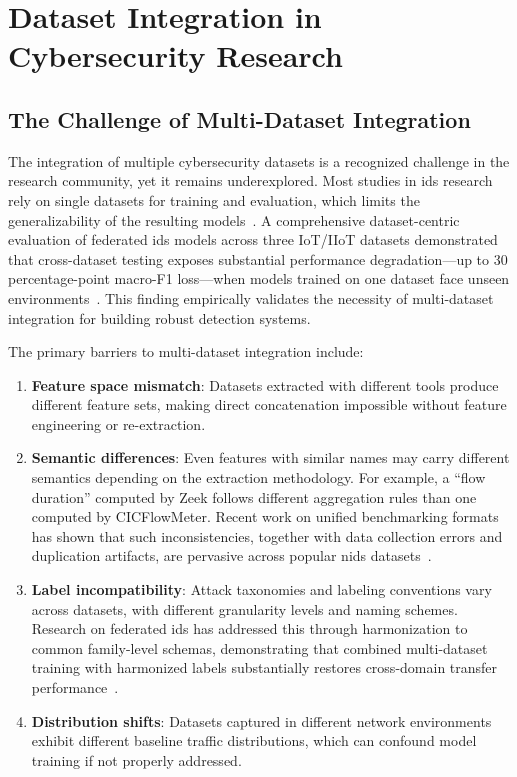 \section{Dataset Integration in Cybersecurity Research}
\label{sec:integration}

\subsection{The Challenge of Multi-Dataset Integration}
\label{subsec:integration-challenge}

The integration of multiple cybersecurity datasets is a recognized challenge in the research community, yet it remains underexplored. Most studies in \gls{ids} research rely on single datasets for training and evaluation, which limits the generalizability of the resulting models~\cite{domenech2025evaluating}. A comprehensive dataset-centric evaluation of federated \gls{ids} models across three IoT/IIoT datasets demonstrated that cross-dataset testing exposes substantial performance degradation---up to 30 percentage-point macro-F1 loss---when models trained on one dataset face unseen environments~\cite{abouhouran2025federated}. This finding empirically validates the necessity of multi-dataset integration for building robust detection systems.

The primary barriers to multi-dataset integration include:

\begin{enumerate}
    \item \textbf{Feature space mismatch}: Datasets extracted with different tools produce different feature sets, making direct concatenation impossible without feature engineering or re-extraction.

    \item \textbf{Semantic differences}: Even features with similar names may carry different semantics depending on the extraction methodology. For example, a ``flow duration'' computed by Zeek follows different aggregation rules than one computed by CICFlowMeter. Recent work on unified benchmarking formats has shown that such inconsistencies, together with data collection errors and duplication artifacts, are pervasive across popular \gls{nids} datasets~\cite{noblet2025nxcap}.

    \item \textbf{Label incompatibility}: Attack taxonomies and labeling conventions vary across datasets, with different granularity levels and naming schemes. Research on federated \gls{ids} has addressed this through harmonization to common family-level schemas, demonstrating that combined multi-dataset training with harmonized labels substantially restores cross-domain transfer performance~\cite{abouhouran2025federated}.

    \item \textbf{Distribution shifts}: Datasets captured in different network environments exhibit different baseline traffic distributions, which can confound model training if not properly addressed.
\end{enumerate}

